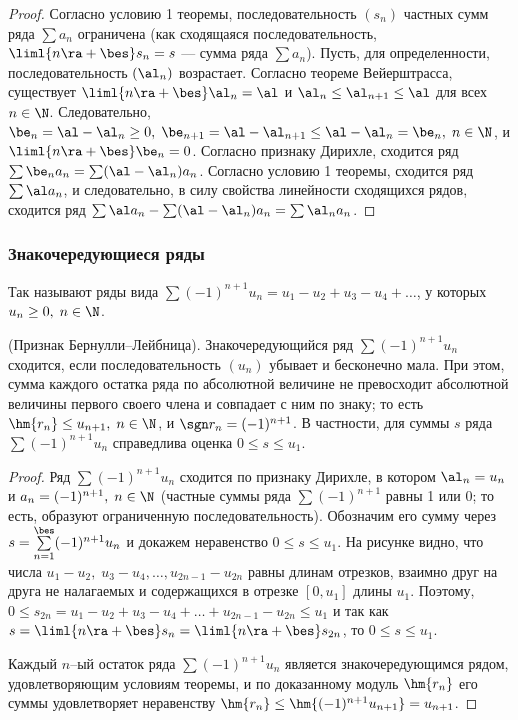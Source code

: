 \documentclass[a4paper]{article}
\begin{document}
\begin{proof}
Согласно условию 1 теоремы, последовательность $(s_n)$ частных сумм
ряда $\sum a_n$ ограничена (как сходящаяся последовательность,
$\liml{n\ra+\bes}s_n=s$ --- сумма ряда $\sum a_n$). Пусть, для
определенности, последовательность $(\al_n)$ возрастает. Согласно
теореме Вейерштрасса, существует $\liml{n\ra+\bes}\al_n=\al$ и
$\al_n \le \al_{n+1} \le \al$ для всех $n\in\N$. Следовательно,
$\be_n = \al - \al_n \ge 0, \; \be_{n+1} = \al - \al_{n+1} \le \al -
\al_n = \be_n, \; n\in\N$, и $\liml{n\ra+\bes}\be_n=0$. Согласно
признаку Дирихле, сходится ряд $\sum \be_n a_n = \sum (\al-\al_n)
a_n$. Согласно условию 1 теоремы, сходится ряд $\sum \al a_n$, и
следовательно, в силу свойства линейности сходящихся рядов, сходится
ряд $\sum \al a_n - \sum (\al - \al_n) a_n = \sum \al_n a_n$.
\end{proof}

\subsubsection{Знакочередующиеся ряды}
Так называют ряды вида $\sum (-1)^{n+1} u_n = u_1 - u_2 + u_3 - u_4
+ \ldots$, у которых $u_n \ge0, \; n\in\N$.

\begin{theorem}
(Признак Бернулли--Лейбница). Знакочередующийся ряд $\sum (-1)^{n+1}
u_n$ сходится, если последовательность $(u_n)$ убывает и бесконечно
мала. При этом, сумма каждого остатка ряда по абсолютной величине не
превосходит абсолютной величины первого своего члена и совпадает с
ним по знаку; то есть $\hm{r_n} \le u_{n+1}, \; n\in\N$, и $\sgn r_n
= (-1)^{n+1}$. В частности, для суммы $s$ ряда $\sum (-1)^{n+1} u_n$
справедлива оценка $0 \le s \le u_1$.
\end{theorem}

\begin{proof}
Ряд $\sum (-1)^{n+1} u_n$ сходится по признаку Дирихле, в котором
$\al_n=u_n$ и $a_n = (-1)^{n+1}, \; n\in\N$ (частные суммы ряда
$\sum (-1)^{n+1}$ равны 1 или 0; то есть, образуют ограниченную
последовательность). Обозначим его сумму через
$s=\sum\limits_{n=1}^{\bes} (-1)^{n+1} u_n$ и докажем неравенство $0
\le s \le u_1$. На рисунке
видно, что числа $u_1 - u_2, \; u_3-u_4, \ldots, u_{2n-1} - u_{2n}$
равны длинам отрезков, взаимно друг на друга не налагаемых и
содержащихся в отрезке $[0,u_1]$ длины $u_1$. Поэтому, $0\le s_{2n}
= u_1-u_2+u_3-u_4 + \ldots + u_{2n-1} - u_{2n} \le u_1$ и так как
$s=\liml{n\ra+\bes} s_n = \liml{n\ra+\bes} s_{2n}$, то $0\le s \le
u_1$.

Каждый $n$--ый остаток ряда $\sum (-1)^{n+1}u_n$ является
знакочередующимся рядом, удовлетворяющим условиям теоремы, и по
доказанному модуль $\hm{r_n}$ его суммы удовлетворяет неравенству
$\hm{r_n} \le \hm{(-1)^{n+1} u_{n+1}} = u_{n+1}$.
\end{proof}
\end{document}
